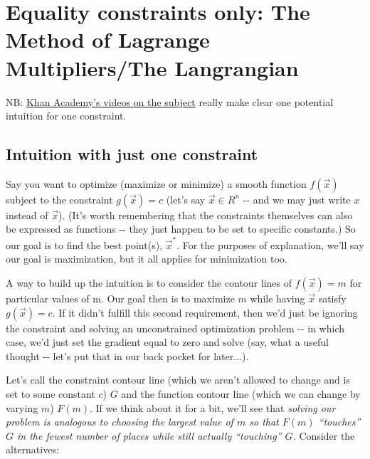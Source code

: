 \documentclass[letterpaper,12pt]{report}
\begin{document}
\section{Equality constraints only: The Method of Lagrange
Multipliers/The
Langrangian}\label{equality-constraints-only-the-method-of-lagrange-multipliersthe-langrangian}

NB:
\href{https://www.khanacademy.org/math/multivariable-calculus/applications-of-multivariable-derivatives/lagrange-multipliers-and-constrained-optimization/v/constrained-optimization-introduction}
{Khan
Academy's videos on the subject} really make clear one potential
intuition for one constraint.

\subsection{Intuition with just one
constraint}\label{intuition-with-just-one-constraint}

Say you want to optimize (maximize or minimize) a smooth function
\(f(\vec{x})\) subject to the constraint \(g(\vec{x}) = c\) (let's say
\(\vec{x} \in R^n\) -\/- and we may just write \(x\) instead of
\(\vec{x}\)). (It's worth remembering that the constraints themselves
can also be expressed as functions -\/- they just happen to be set to
specific constants.) So our goal is to find the best point(s),
\({\vec{x}^*}\). For the purposes of explanation, we'll say our goal is
maximization, but it all applies for minimization too.

A way to build up the intuition is to consider the contour lines of
\(f(\vec{x}) = m\) for particular values of m. Our goal then is to
maximize \(m\) while having \(\vec{x}\) satisfy \(g(\vec{x}) = c\). If
it didn't fulfill this second requirement, then we'd just be ignoring
the constraint and solving an unconstrained optimization problem -\/- in
which case, we'd just set the gradient equal to zero and solve (say,
what a useful thought -\/- let's put that in our back pocket for
later...).

Let's call the constraint contour line (which we aren't allowed to
change and is set to some constant \(c\)) \(G\) and the function contour
line (which we can change by varying \(m\)) \(F(m)\). If we think about
it for a bit, we'll see that \emph{solving our problem is analogous to
choosing the largest value of \(m\) so that \(F(m)\) ``touches'' \(G\) in
the fewest number of places while still actually ``touching'' \(G\).}
Consider the alternatives:
\end{document}
